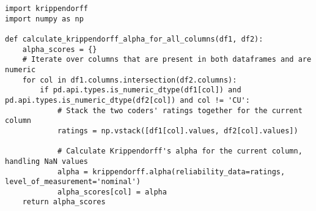 \begin{lstlisting}
import krippendorff
import numpy as np

def calculate_krippendorff_alpha_for_all_columns(df1, df2):
    alpha_scores = {}
    # Iterate over columns that are present in both dataframes and are numeric
    for col in df1.columns.intersection(df2.columns):
        if pd.api.types.is_numeric_dtype(df1[col]) and pd.api.types.is_numeric_dtype(df2[col]) and col != 'CU':
            # Stack the two coders' ratings together for the current column
            ratings = np.vstack([df1[col].values, df2[col].values])
            
            # Calculate Krippendorff's alpha for the current column, handling NaN values
            alpha = krippendorff.alpha(reliability_data=ratings, level_of_measurement='nominal')
            alpha_scores[col] = alpha
    return alpha_scores

\end{lstlisting}